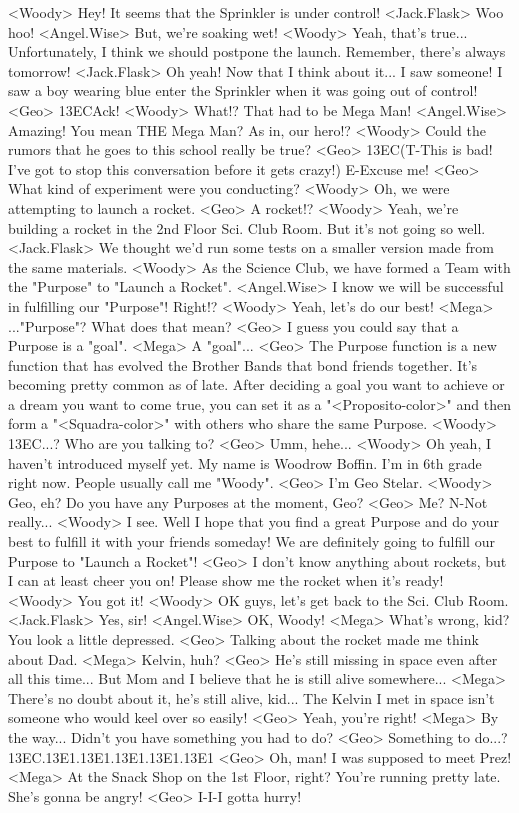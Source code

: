 <Woody> Hey! It seems that the Sprinkler is under control! 
<Jack.Flask> Woo hoo! 
<Angel.Wise> But, we're soaking wet! 
<Woody> Yeah, that's true... Unfortunately, I think we should postpone the launch. 
Remember, there's always tomorrow! 
<Jack.Flask> Oh yeah! Now that I think about it... I saw someone! 
I saw a boy wearing blue enter the Sprinkler when it was going out of control! 
<Geo> {13}{EC}Ack! 
<Woody> What!? That had to be Mega Man! 
<Angel.Wise> Amazing! You mean THE Mega Man? As in, our hero!? 
<Woody> Could the rumors that he goes to this school really be true? 
<Geo> {13}{EC}(T-This is bad! I've got to  stop this conversation  before it gets crazy!) 
E-Excuse me! 
<Geo> What kind of experiment were you conducting? 
<Woody> Oh, we were attempting to launch a rocket. 
<Geo> A rocket!? 
<Woody> Yeah, we're building a rocket in the 2nd Floor Sci. Club Room. 
But it's not going so well. 
<Jack.Flask> We thought we'd run some tests on a smaller version 
made from the same materials. 
<Woody> As the Science Club, we have formed a Team with 
the "Purpose" to  "Launch a Rocket". 
<Angel.Wise> I know we will be successful in fulfilling our "Purpose"! 
Right!? 
<Woody> Yeah, let's do our best! 
<Mega> ..."Purpose"? 
What does that mean? 
<Geo> I guess you could say that a Purpose is a "goal". 
<Mega> A "goal"... 
<Geo> The Purpose function is a new function that has evolved the Brother Bands 
that bond friends together. It's becoming pretty common as of late. 
After deciding a goal you want to achieve or a 
dream you want to come true, you can set it as a "<Proposito-color>" and then form 
a "<Squadra-color>" with others who share the same Purpose. 
<Woody> {13}{EC}...? 
Who are you talking to? 
<Geo> Umm, hehe... 
<Woody> Oh yeah, I haven't introduced myself yet. 
My name is Woodrow Boffin. I'm in 6th grade right now. 
People usually call me "Woody". 
<Geo> I'm Geo Stelar. 
<Woody> Geo, eh? Do you have any Purposes at the moment, Geo? 
<Geo> Me? N-Not really... 
<Woody> I see. 
Well I hope that you find a great Purpose and do 
your best to fulfill it with your friends someday! 
We are definitely going to fulfill our Purpose to  "Launch a Rocket"! 
<Geo> I don't know anything about rockets, but I can at least cheer you on! 
Please show me the rocket when it's ready! 
<Woody> You got it! 
<Woody> OK guys, let's get back to the Sci. Club Room. 
<Jack.Flask> Yes, sir! 
<Angel.Wise> OK, Woody! 
<Mega> What's wrong, kid? You look a little depressed. 
<Geo> Talking about the rocket made me think about Dad. 
<Mega> Kelvin, huh? 
<Geo> He's still missing in space even after all this time... 
But Mom and I believe that he is still alive somewhere... 
<Mega> There's no doubt about it, he's still alive, kid... 
The Kelvin I met in space isn't someone who would keel over so easily! 
<Geo> Yeah, you're right! 
<Mega> By the way... Didn't you have something you had to do? 
<Geo> Something to do...? 
{13}{EC}.{13}{E1}.{13}{E1}.{13}{E1}.{13}{E1}.{13}{E1} 
<Geo> Oh, man! 
I was supposed to meet Prez! 
<Mega> At the Snack Shop on the 1st Floor, right? 
You're running pretty late. She's gonna be angry! 
<Geo> I-I-I gotta hurry! 
